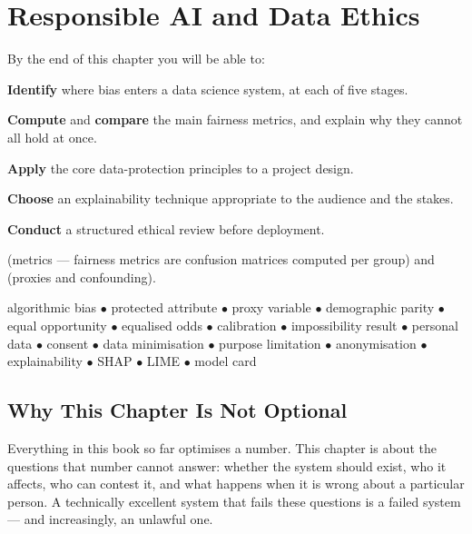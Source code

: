 \chapter{Responsible AI and Data Ethics}\label{ch:ethics}

\begin{outcomes}
By the end of this chapter you will be able to:
\begin{tight}
  \item \textbf{Identify} where bias enters a data science system, at each of five stages.
  \item \textbf{Compute} and \textbf{compare} the main fairness metrics, and explain why they cannot all hold at once.
  \item \textbf{Apply} the core data-protection principles to a project design.
  \item \textbf{Choose} an explainability technique appropriate to the audience and the stakes.
  \item \textbf{Conduct} a structured ethical review before deployment.
\end{tight}
\end{outcomes}

\begin{prereq}
 (metrics --- fairness metrics are confusion matrices computed per
group) and  (proxies and confounding).
\end{prereq}

\begin{keyterms}
algorithmic bias $\bullet$ protected attribute $\bullet$ proxy variable $\bullet$
demographic parity $\bullet$ equal opportunity $\bullet$ equalised odds $\bullet$
calibration $\bullet$ impossibility result $\bullet$ personal data $\bullet$ consent
$\bullet$ data minimisation $\bullet$ purpose limitation $\bullet$ anonymisation
$\bullet$ explainability $\bullet$ SHAP $\bullet$ LIME $\bullet$ model card
\end{keyterms}

\section{Why This Chapter Is Not Optional}

\begin{conceptbox}
Everything in this book so far optimises a number. This chapter is about the
questions that number cannot answer: whether the system should exist, who it
affects, who can contest it, and what happens when it is wrong about a particular
person. A technically excellent system that fails these questions is a failed
system --- and increasingly, an unlawful one.
\end{conceptbox}

